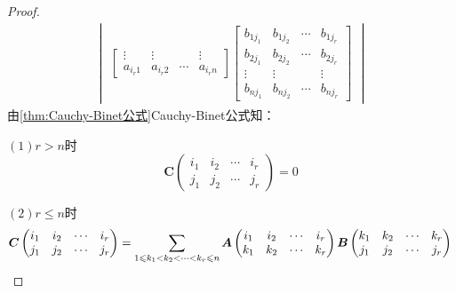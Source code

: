 {\begin{proof}
\begin{align*}
\begin{vmatrix}
\begin{bmatrix}
                    \vdots   & \vdots   &        & \vdots   \\
                    a_{i_r1} & a_{i_r2} & \cdots & a_{i_rn}
                \end{bmatrix}
                                    \begin{bmatrix}
                    b_{1j_1} & b_{1j_2} & \cdots & b_{1j_r} \\
                    b_{2j_1} & b_{2j_2} & \cdots & b_{2j_r} \\
                    \vdots   & \vdots   &        & \vdots   \\
                    b_{nj_1} & b_{nj_2} & \cdots & b_{nj_r}
                \end{bmatrix}
                                \end{vmatrix}
        \end{align*}
        由\cref{thm:Cauchy-Binet公式}Cauchy-Binet公式知：

        $(1)r > n$时
        \[
            \bm{C}\begin{pmatrix}
                i_1 & i_2 & \cdots & i_r \\
                j_1 & j_2 & \cdots & j_r
            \end{pmatrix}=0
        \]

        $(2)r\leqslant n$时
        \[
            \bm{C}\begin{pmatrix}
                i_1 & i_2 & \cdots & i_r \\
                j_1 & j_2 & \cdots & j_r
            \end{pmatrix}=
            \sum_{1\leqslant k_1<k_2<\cdots<k_r\leqslant n}\bm{A}\begin{pmatrix}
                i_1 & i_2 & \cdots & i_r \\
                k_1 & k_2 & \cdots & k_r
            \end{pmatrix}\bm{B}\begin{pmatrix}
                k_1 & k_2 & \cdots & k_r \\
                j_1 & j_2 & \cdots & j_r
            \end{pmatrix}\qedhere
        \]
    \end{proof}
}
